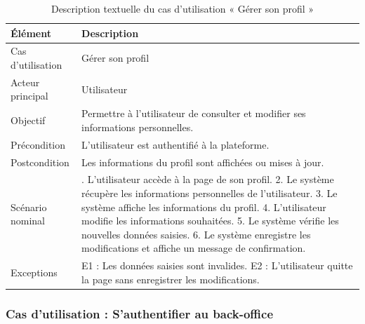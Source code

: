\begin{table}[H]
\centering
\caption{Description textuelle du cas d’utilisation « Gérer son profil »}
\label{tableau:3-4}
\renewcommand{\arraystretch}{1.2}
\begin{tabularx}{\textwidth}{|>{\raggedright\arraybackslash}X|>{\raggedright\arraybackslash}X|}
\hline
\rowcolor[HTML]{ECF4FF}
\textbf{Élément} & \textbf{Description} \\
\hline
Cas d’utilisation & Gérer son profil \\
\hline
Acteur principal & Utilisateur \\
\hline
Objectif & Permettre à l’utilisateur de consulter et modifier ses informations personnelles. \\
\hline
Précondition & L’utilisateur est authentifié à la plateforme. \\
\hline
Postcondition & Les informations du profil sont affichées ou mises à jour. \\
\hline
Scénario nominal & 1. L’utilisateur accède à la page de son profil.\newline{} 2. Le système récupère les informations personnelles de l’utilisateur.\newline{} 3. Le système affiche les informations du profil.\newline{} 4. L’utilisateur modifie les informations souhaitées.\newline{} 5. Le système vérifie les nouvelles données saisies.\newline{} 6. Le système enregistre les modifications et affiche un message de confirmation. \\
\hline
Exceptions & E1 : Les données saisies sont invalides.\newline{} E2 : L’utilisateur quitte la page sans enregistrer les modifications. \\
\hline
\end{tabularx}
\end{table}


\subsubsection{Cas d’utilisation : S’authentifier au back-office}



